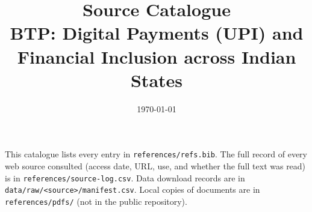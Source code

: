 \documentclass[11pt,a4paper]{article}
\title{Source Catalogue\\[2pt]\large BTP: Digital Payments (UPI) and Financial Inclusion across Indian States}
\date{\today}
\begin{document}
\maketitle

\noindent This catalogue lists every entry in \texttt{references/refs.bib}. The full record of every web source
consulted (access date, URL, use, and whether the full text was read) is in \texttt{references/source-log.csv}.
Data download records are in \texttt{data/raw/<source>/manifest.csv}. Local copies of documents are in
\texttt{references/pdfs/} (not in the public repository).

\nocite{*}


\end{document}
